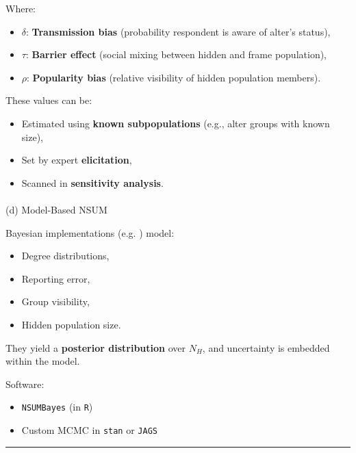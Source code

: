 \documentclass[
  12pt,
  letterpaper,
  DIV=11,
  numbers=noendperiod]{scrartcl}
\makeatletter
\let\oldparagraph\paragraph
\renewcommand{\paragraph}{
    \@ifstar
      \xxxParagraphStar
      \xxxParagraphNoStar
  }
\newcommand{\xxxParagraphStar}[1]{\oldparagraph*{#1}\mbox{}}
\newcommand{\xxxParagraphNoStar}[1]{\oldparagraph{#1}\mbox{}}
\theoremstyle{plain}
\theoremstyle{definition}
\makeatother
\begin{document}
Where:

\begin{itemize}
\item
  \(\delta\): \textbf{Transmission bias} (probability respondent is
  aware of alter's status),
\item
  \(\tau\): \textbf{Barrier effect} (social mixing between hidden and
  frame population),
\item
  \(\rho\): \textbf{Popularity bias} (relative visibility of hidden
  population members).
\end{itemize}

These values can be:

\begin{itemize}
\item
  Estimated using \textbf{known subpopulations} (e.g., alter groups with
  known size),
\item
  Set by expert \textbf{elicitation},
\item
  Scanned in \textbf{sensitivity analysis}.
\end{itemize}

\paragraph{(d) Model-Based NSUM}\label{d-model-based-nsum}

Bayesian implementations (e.g. \textcite{malt15-estimating}) model:

\begin{itemize}
\item
  Degree distributions,
\item
  Reporting error,
\item
  Group visibility,
\item
  Hidden population size.
\end{itemize}

They yield a \textbf{posterior distribution} over \(N_H\), and
uncertainty is embedded within the model.

Software:

\begin{itemize}
\item
  \texttt{NSUMBayes} (in \texttt{R})
\item
  Custom MCMC in \texttt{stan} or \texttt{JAGS}
\end{itemize}

\begin{center}\rule{0.5\linewidth}{0.5pt}\end{center}
\end{document}
